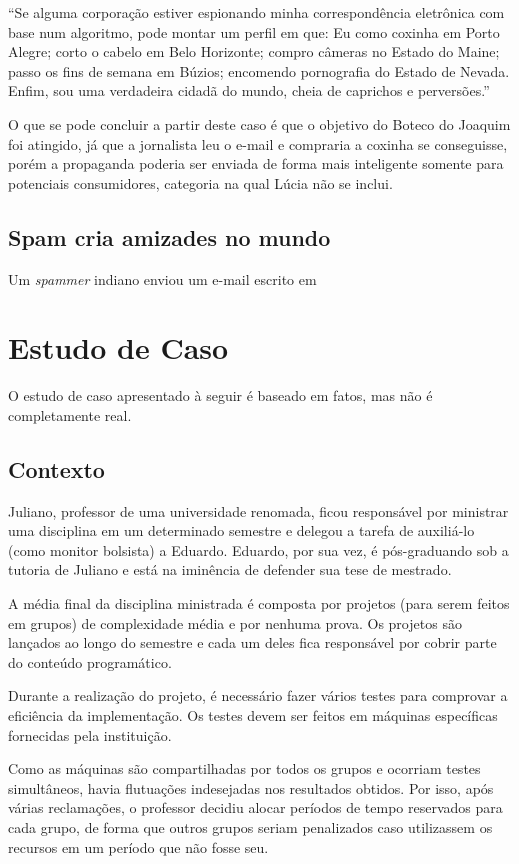 \documentclass[a4paper,dvipdfm]{article}
\begin{document}
		``Se alguma corporação estiver espionando minha correspondência eletrônica com base num algoritmo, pode montar um perfil em que: 
		Eu como coxinha em Porto Alegre; 
		corto o cabelo em Belo Horizonte; 
		compro câmeras no Estado do Maine; 
		passo os fins de semana em Búzios; 
		encomendo pornografia do Estado de Nevada. 
		Enfim, sou uma verdadeira cidadã do mundo, cheia de caprichos e perversões.''
			
		O que se pode concluir a partir deste caso é que o objetivo do Boteco do Joaquim foi atingido, já que a jornalista leu o e-mail e compraria a coxinha se conseguisse, porém a propaganda poderia ser enviada de forma mais inteligente somente para potenciais consumidores, categoria na qual Lúcia não se inclui.

	\subsection {Spam cria amizades no mundo}
		Um \emph{spammer} indiano enviou um e-mail escrito em 
\newpage
\section{Estudo de Caso}
	O estudo de caso apresentado à seguir é baseado em fatos, mas não é completamente real. 

	\subsection{Contexto}	
    Juliano, professor de uma universidade renomada, ficou responsável por ministrar uma disciplina em um determinado semestre e delegou a tarefa de auxiliá-lo (como monitor bolsista) a Eduardo. 
	Eduardo, por sua vez, é pós-graduando sob a tutoria de Juliano e está na iminência de defender sua tese de mestrado.

    A média final da disciplina ministrada é composta por projetos (para serem feitos em grupos) de complexidade média e por nenhuma prova.
	Os projetos são lançados ao longo do semestre e cada um deles fica responsável por cobrir parte do conteúdo programático.

	Durante a realização do projeto, é necessário fazer vários testes para comprovar a eficiência da implementação. 
	Os testes devem ser feitos em máquinas específicas fornecidas pela instituição.
	
	Como as máquinas são compartilhadas por todos os grupos e ocorriam testes simultâneos, havia flutuações indesejadas nos resultados obtidos.
	Por isso, após várias reclamações, o professor decidiu alocar períodos de tempo reservados para cada grupo, de forma que outros grupos seriam penalizados caso utilizassem os recursos em um período que não fosse seu.
\end{document}
